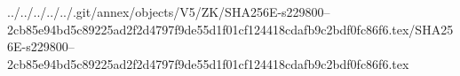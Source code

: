 ../../../../../.git/annex/objects/V5/ZK/SHA256E-s229800--2cb85e94bd5c89225ad2f2d4797f9de55d1f01cf124418cdafb9c2bdf0fc86f6.tex/SHA256E-s229800--2cb85e94bd5c89225ad2f2d4797f9de55d1f01cf124418cdafb9c2bdf0fc86f6.tex